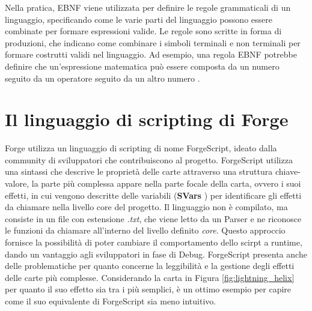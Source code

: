 Nella pratica, EBNF viene utilizzata per definire le regole grammaticali di un linguaggio, specificando come le varie parti del linguaggio possono essere combinate per formare espressioni valide. Le regole sono scritte in forma di produzioni, che indicano come combinare i simboli terminali e non terminali per formare costrutti validi nel linguaggio. Ad esempio, una regola EBNF potrebbe definire che un'espressione matematica può essere composta da un numero seguito da un operatore seguito da un altro numero \cite{feynman2016ebnf}.

\section{Il linguaggio di scripting di Forge}\label{sec:forgescript}
Forge utilizza un linguaggio di scripting di nome ForgeScript, ideato dalla community di sviluppatori che contribuiscono al progetto. ForgeScript utilizza una sintassi che descrive le proprietà delle carte attraverso una struttura chiave-valore, la parte più complessa appare nella parte focale della carta, ovvero i suoi effetti, in cui vengono descritte delle variabili (\textbf{SVars} \cite{forge_api}) per identificare gli effetti da chiamare nella livello core del progetto. Il linguaggio non è compilato, ma consiste in un file con estensione \emph{.txt}, che viene letto da un Parser e ne riconosce le funzioni da chiamare all'interno del livello definito \emph{core}. Questo approccio fornisce la possibilità di poter cambiare il comportamento dello scirpt a runtime, dando un vantaggio agli sviluppatori in fase di Debug. ForgeScript  presenta anche delle problematiche per quanto concerne la leggibilità e la gestione degli effetti delle carte più complesse. Considerando la carta in Figura \ref{fig:lightning_helix} per quanto il suo effetto sia tra i più semplici, è un ottimo esempio per capire come il suo equivalente di ForgeScript sia meno intuitivo.

